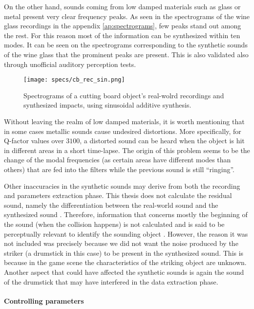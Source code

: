 On the other hand, sounds coming from low damped materials such as glass or metal present very clear frequency peaks. As seen in the spectrograms of the wine glass recordings in the appendix \ref{ap:spectrograms}, few peaks stand out among the rest. For this reason most of the information can be synthesized within ten modes. It can be seen on the spectrograms corresponding to the synthetic sounds of the wine glass that the prominent peaks are present. This is also validated also through unofficial auditory perception tests. 


\begin{figure}[H]
  \centering
    \texttt{[image: specs/cb\_rec\_sin.png]}
      \caption{Spectrograms of a cutting board object's real-wolrd recordings and synthesized impacts, using sinusoidal additive synthesis.}
      \label{fig:specs_cb}
\end{figure}

Without leaving the realm of low damped materials, it is worth mentioning that in some cases metallic sounds cause undesired distortions. More specifically, for Q-factor values over $3100$, a distorted sound can be heard when the object is hit in different areas  in a short time-lapse. The origin of this problem seems to be the change of the modal frequencies (as certain areas have different modes than others) that are fed into the filters while the previous sound is still ``ringing''. 


Other inaccuracies in the synthetic sounds may derive from both the recording and parameters extraction phase. This thesis does not calculate the residual sound, namely the differentiation between the real-world sound and the synthesized sound \cite{ren2013example}. Therefore, information that concerns mostly the beginning of the sound (when the collision happens) is not calculated and is said to be perceptually relevant to identify the sounding object \cite{freed1990auditory}. However, the reason it was not included was precisely because we did not want the noise produced by the striker (a drumstick in this case) to be present in the synthesized sound. This is because in the game scene the characteristics of the striking object are unknown. Another aspect that could have affected the synthetic sounds is again the sound of the drumstick that may have interfered in the data extraction phase.

\paragraph{Controlling parameters\\}

